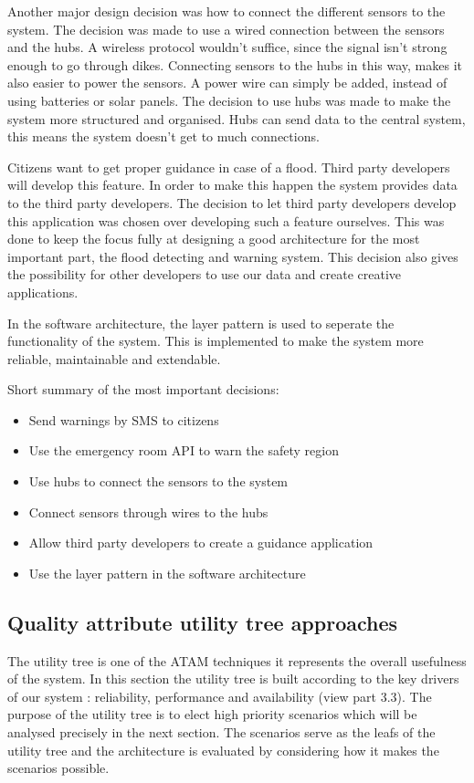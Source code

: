 Another major design decision was how to connect the different sensors to the system. The decision was made to use a wired connection between the sensors and the hubs. A wireless protocol wouldn't suffice, since the signal isn't strong enough to go through dikes. Connecting sensors to the hubs in this way, makes it also easier to power the sensors. A power wire can simply be added, instead of using batteries or solar panels. The decision to use hubs was made to make the system more structured and organised. Hubs can send data to the central system, this means the system doesn't get to much connections. 

Citizens want to get proper guidance in case of a flood. Third party developers will develop this feature. In order to make this happen the system provides data to the third party developers. The decision to let third party developers develop this application was chosen over developing such a feature ourselves. This was done to keep the focus fully at designing a good architecture for the most important part, the flood detecting and warning system. This decision also gives the possibility for other developers to use our data and create creative applications. 

In the software architecture, the layer pattern is used to seperate the functionality of the system. This is implemented to make the system more reliable, maintainable and extendable.

Short summary of the most important decisions:
\begin{itemize}
	\item Send warnings by SMS to citizens
	\item Use the emergency room API to warn the safety region
	\item Use hubs to connect the sensors to the system
	\item Connect sensors through wires to the hubs
	\item Allow third party developers to create a guidance application
	\item Use the layer pattern in the software architecture
\end{itemize}


\subsection{Quality attribute utility tree approaches}
The utility tree is one of the ATAM techniques it represents the overall usefulness of the system. 
In this section the utility tree is built according to the key drivers of our system : reliability, performance and availability (view part 3.3). The purpose of the utility tree is to elect high priority scenarios which will be analysed precisely in the next section.
The scenarios serve as the leafs of the utility tree and the architecture is evaluated by considering how it makes the scenarios possible.

